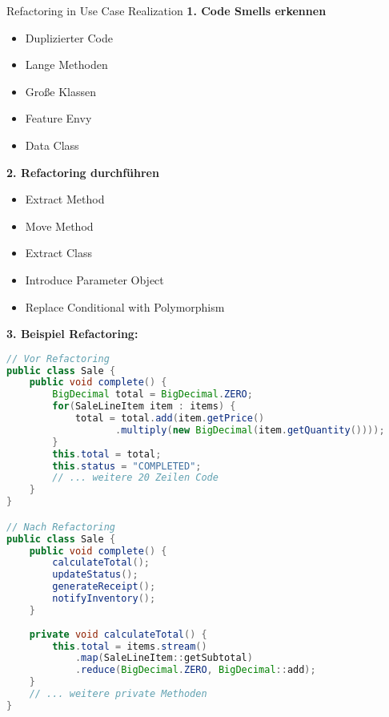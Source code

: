\begin{KR}{Refactoring in Use Case Realization}
\textbf{1. Code Smells erkennen}
\begin{itemize}
    \item Duplizierter Code
    \item Lange Methoden
    \item Große Klassen
    \item Feature Envy
    \item Data Class
\end{itemize}

\textbf{2. Refactoring durchführen}
\begin{itemize}
    \item Extract Method
    \item Move Method
    \item Extract Class
    \item Introduce Parameter Object
    \item Replace Conditional with Polymorphism
\end{itemize}

\textbf{3. Beispiel Refactoring:}
\begin{lstlisting}[language=Java, style=basesmol]
// Vor Refactoring
public class Sale {
    public void complete() {
        BigDecimal total = BigDecimal.ZERO;
        for(SaleLineItem item : items) {
            total = total.add(item.getPrice()
                   .multiply(new BigDecimal(item.getQuantity())));
        }
        this.total = total;
        this.status = "COMPLETED";
        // ... weitere 20 Zeilen Code
    }
}

// Nach Refactoring
public class Sale {
    public void complete() {
        calculateTotal();
        updateStatus();
        generateReceipt();
        notifyInventory();
    }
    
    private void calculateTotal() {
        this.total = items.stream()
            .map(SaleLineItem::getSubtotal)
            .reduce(BigDecimal.ZERO, BigDecimal::add);
    }
    // ... weitere private Methoden
}
\end{lstlisting}
\end{KR}

